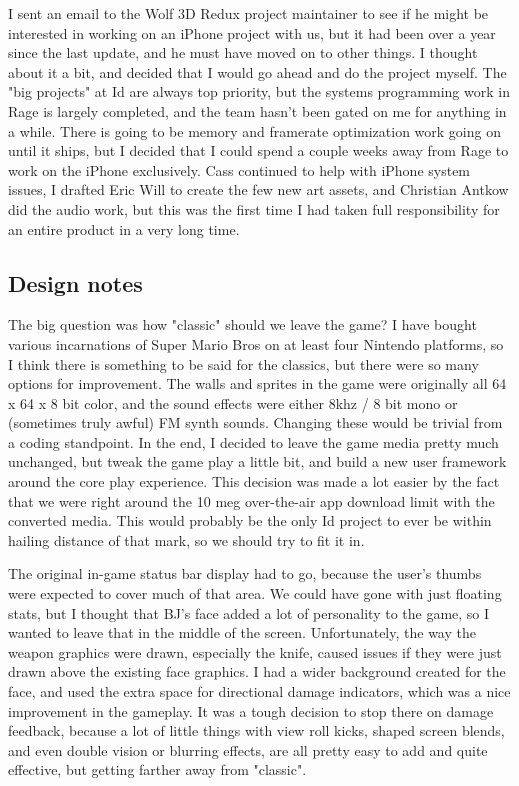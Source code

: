 \documentclass[book.tex]{subfiles}
\begin{document}
I sent an email to the Wolf 3D Redux project maintainer to see if he might be interested in working on an iPhone project with us, but it had been over a year since the last update, and he must have moved on to other things.  I thought about it a bit, and decided that I would go ahead and do the project myself.  The "big projects" at Id are always top priority, but the systems programming work in Rage is largely completed, and the team hasn't been gated on me for anything in a while.  There is going to be memory and framerate optimization  work going on until it ships, but I decided that I could spend a couple weeks away from Rage to work on the iPhone exclusively.  Cass continued to help with iPhone system issues, I drafted Eric Will to create the few new art assets, and Christian Antkow did the audio work, but this was the first time I had taken full responsibility for an entire product in a very long time.\\
\par

\subsection{Design notes}

The big question was how "classic" should we leave the game?  I have bought various incarnations of Super Mario Bros on at least four Nintendo platforms, so I think there is something to be said for the classics, but there were so many options for improvement.  The walls and sprites in the game were originally all 64 x 64 x 8 bit color, and the sound effects were either 8khz / 8 bit mono or (sometimes truly awful) FM synth sounds.  Changing these would be trivial from a coding standpoint.  In the end, I decided to leave the game media pretty much unchanged, but tweak the game play a little bit, and build a new user framework around the core play experience.  This decision was made a lot easier by the fact that we were right around the 10 meg over-the-air app download limit with the converted media.  This would probably be the only Id project to ever be within hailing distance of that mark, so we should try to fit it in.\\
\par

The original in-game status bar display had to go, because the user's thumbs were expected to cover much of that area.  We could have gone with just floating stats, but I thought that BJ's face added a lot of personality to the game, so I wanted to leave that in the middle of the screen.  Unfortunately, the way the weapon graphics were drawn, especially the knife, caused issues if they were just drawn above the existing face graphics.  I had a wider background created for the face, and used the extra space for directional damage indicators, which was a nice improvement in the gameplay.  It was a tough decision to stop there on damage feedback, because a lot of little things with view roll kicks, shaped screen blends, and even double vision or blurring effects, are all pretty easy to add and quite effective, but getting farther away from "classic".\\
\par
\end{document}
